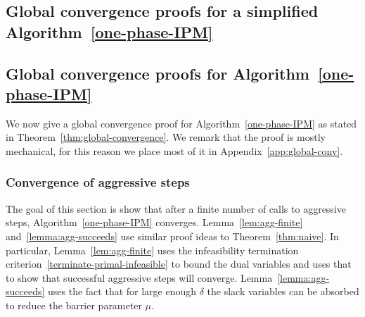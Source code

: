\documentclass{article}
\begin{document}
\subsection{Global convergence proofs for a simplified Algorithm~\ref{one-phase-IPM}}



\subsection{Global convergence proofs for Algorithm~\ref{one-phase-IPM}}\label{sec:global-conv}


We now give a global convergence proof for Algorithm~\ref{one-phase-IPM} as stated in Theorem~\ref{thm:global-convergence}. We remark that the proof is mostly mechanical, for this reason we place most of it in Appendix~\ref{app:global-conv}. 



\subsubsection{Convergence of aggressive steps}

The goal of this section is show that after a finite number of calls to aggressive steps, Algorithm~\ref{one-phase-IPM} converges. Lemma~\ref{lem:agg-finite} and~\ref{lemma:agg-succeeds} use similar proof ideas to Theorem~\ref{thm:naive}. In particular, Lemma~\ref{lem:agg-finite} uses the infeasibility termination criterion~\eqref{terminate-primal-infeasible} to bound the dual variables and uses that to show that successful aggressive steps will converge. Lemma~\ref{lemma:agg-succeeds} uses the fact that for large enough $\delta$ the slack variables can be absorbed to reduce the barrier parameter $\mu$.
\end{document}
